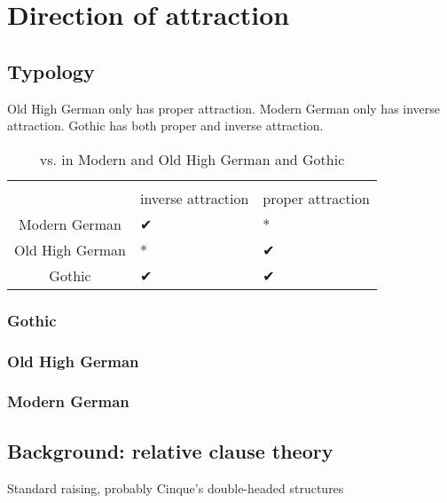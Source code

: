 
\chapter{Direction of attraction}


  \section{Typology}
Old High German only has proper attraction. Modern German only has inverse attraction. Gothic has both proper and inverse attraction.

\begin{table}[h]\label{tbl:intextgoth}
	\center
	\caption { vs.  in Modern and Old High German and Gothic}
	\begin{minipage}{\linewidth}
		\begin{tabularx}{\textwidth}{c *{2}{Y}}
		\toprule
		 								& 				& 				\\
										& inverse attraction	& proper attraction		\\
		\midrule
		Modern German 	& ✔			 							&	*										\\
		Old High German	& *										&	✔										\\
		Gothic					&	✔										&	✔										\\
		\bottomrule
		\end{tabularx}
	\end{minipage}
\end{table}


    \subsection{Gothic}
    \subsection{Old High German}
    \subsection{Modern German}



  \section{Background: relative clause theory}
Standard raising, probably Cinque's double-headed structures


